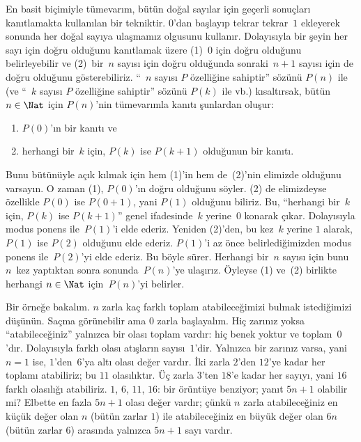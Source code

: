 \documentclass[../../../include/open-logic-section]{subfiles}
\begin{document}


En basit biçimiyle tümevarım, bütün doğal sayılar için geçerli
sonuçları kanıtlamakta kullanılan bir tekniktir. $0$'dan başlayıp
tekrar tekrar~$1$ ekleyerek sonunda her doğal sayıya ulaşmamız olgusunu
kullanır. Dolayısıyla bir şeyin her sayı için doğru olduğunu kanıtlamak
üzere (1)~$0$ için doğru olduğunu belirleyebilir ve (2)~bir~$n$ sayısı
için doğru olduğunda sonraki~$n+1$ sayısı için de doğru olduğunu
gösterebiliriz. ``~$n$ sayısı $P$ özelliğine sahiptir'' sözünü $P(n)$
ile (ve ``~$k$ sayısı $P$ özelliğine sahiptir'' sözünü $P(k)$ ile vb.)
kısaltırsak, bütün $n \in \Nat$ için $P(n)$'nin tümevarımla kanıtı
şunlardan oluşur:
\begin{enumerate}
\item $P(0)$'ın bir kanıtı ve
\item herhangi bir~$k$ için, $P(k)$ ise $P(k+1)$ olduğunun bir kanıtı.
\end{enumerate}
Bunu bütünüyle açık kılmak için hem (1)'in hem de~(2)'nin elimizde
olduğunu varsayın. O zaman (1), $P(0)$'ın doğru olduğunu söyler. (2) de
elimizdeyse özellikle $P(0)$ ise $P(0+1)$, yani $P(1)$ olduğunu biliriz.
Bu, ``herhangi bir~$k$ için, $P(k)$ ise $P(k+1)$'' genel ifadesinde~$k$
yerine~$0$ konarak çıkar. Dolayısıyla modus ponens ile~$P(1)$'i elde
ederiz. Yeniden (2)'den, bu kez~$k$ yerine $1$ alarak, $P(1)$ ise
$P(2)$ olduğunu elde ederiz. $P(1)$'i az önce belirlediğimizden modus
ponens ile~$P(2)$'yi elde ederiz. Bu böyle sürer. Herhangi bir~$n$
sayısı için bunu $n$~kez yaptıktan sonra sonunda~$P(n)$'ye ulaşırız.
Öyleyse (1) ve~(2) birlikte herhangi $n \in \Nat$ için~$P(n)$'yi
belirler.

Bir örneğe bakalım. $n$ zarla kaç farklı toplam atabileceğimizi bulmak
istediğimizi düşünün. Saçma görünebilir ama $0$ zarla başlayalım. Hiç
zarınız yoksa ``atabileceğiniz'' yalnızca bir olası toplam vardır: hiç
benek yoktur ve toplam~$0$'dır. Dolayısıyla farklı olası atışların
sayısı~$1$'dir. Yalnızca bir zarınız varsa, yani $n=1$ ise, $1$'den~$6$'ya
altı olası değer vardır. İki zarla $2$'den $12$'ye kadar her toplamı
atabiliriz; bu $11$ olasılıktır. Üç zarla $3$'ten $18$'e kadar her
sayıyı, yani $16$ farklı olasılığı atabiliriz. $1$, $6$, $11$, $16$:
  bir örüntüye benziyor; yanıt $5n+1$ olabilir mi? Elbette en fazla
  $5n+1$ olası değer vardır; çünkü $n$ zarla atabileceğiniz en küçük değer olan
$n$ (bütün zarlar $1$) ile atabileceğiniz en büyük değer olan $6n$
(bütün zarlar $6$) arasında yalnızca $5n+1$ sayı vardır.
\end{document}
